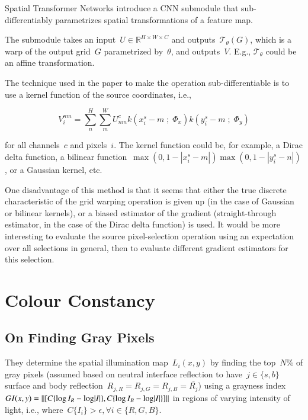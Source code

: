 \documentclass[a4paper, 12pt]{article}
\DeclarePairedDelimiter\abs{\lvert}{\rvert}%
\DeclarePairedDelimiter\norm{\lVert}{\rVert}%
\begin{document}
Spatial Transformer Networks introduce a CNN submodule that sub-differentiably
parametrizes spatial transformations of a feature map.

The submodule takes an input~$U \in \mathbb{R}^{H \times W \times C}$ and
outputs~$\mathcal{T}_\theta(G)$, which is a warp of the output grid~$G$
parametrized by~$\theta$, and outputs~$V$. E.g., $\mathcal{T}_\theta$ could be
an affine transformation.

The technique used in the paper to make the operation sub-differentiable is to
use a kernel function of the source coordinates, i.e.,

\begin{equation*}
        V_i^{nm} = \sum_n^H \sum_m^W U^c_{nm} k(x_i^s - m\;;\; \Phi_x)
                k(y_i^s - m\;;\; \Phi_y)
\end{equation*}

for all channels~$c$ and pixels~$i$. The kernel function could be, for example,
a Dirac delta function, a bilinear
function~$\max(0, 1 - |x_i^s - m|)\max(0, 1 - |y_i^s - n|)$, or a Gaussian
kernel, etc.

One disadvantage of this method is that it seems that either the true discrete
characteristic of the grid warping operation is given up (in the case of
Gaussian or bilinear kernels), or a biased estimator of the gradient
(straight-through estimator, in the case of the Dirac delta function) is used.
It would be more interesting to evaluate the source pixel-selection operation
using an expectation over all selections in general, then to evaluate different
gradient estimators for this selection.


\section{Colour Constancy}

\subsection{On Finding Gray Pixels~\cite{qian2019cvpr}}

They determine the spatial illumination map~$L_i(x, y)$ by finding the
top~$N\%$ of gray pixels (assumed based on neutral interface reflection to
have~$j \in \{s,b\}$ surface and body
reflection~$R_{j,R} = R_{j,G} = R_{j,B} = \bar{R_j}$) using a grayness
index~$GI(x, y) = \norm{[C\{\log I_R - \log\abs{I}\}, C\{\log I_B -
\log\abs{I}\}]}$ in regions of varying intensity of light, i.e.,
where~$C\{I_i\} > \epsilon, \forall i\in \{R,G,B\}$.
\end{document}
